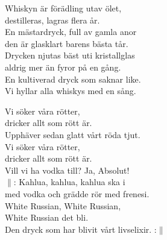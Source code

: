 \documentclass[a6paper, 10pt, twoside]{article}
\begin{document}
\noindent
\begin{center}
\end{center}
\begin{lyrics} 
Whiskyn är förädling utav ölet,\\
destilleras, lagras flera år.\\
En mästardryck, full av gamla anor\\
den är glasklart barens bästa tår.
\vspace{5pt}\\
Drycken njutas bäst uti kristallglas\\
aldrig mer än fyror på en gång.\\
En kultiverad dryck som saknar like.\\
Vi hyllar alla whiskys med en sång.
\end{lyrics}

\begin{center}
\end{center}
\begin{lyrics}
Vi söker våra rötter,\\
dricker allt som rött är.\\
Upphäver sedan glatt vårt röda tjut.
\vspace{5pt}\\
Vi söker våra rötter,\\
dricker allt som rött är.\\
Vill vi ha vodka till? Ja, Absolut!
\vspace{5pt}\\
$\|$: Kahlua, kahlua, kahlua ska i\\
med vodka och grädde rör med frenesi.\\
White Russian, White Russian, \\
White Russian det bli.\\
Den dryck som har blivit vårt livselixir. :$\|$
\end{lyrics}
\end{document}
